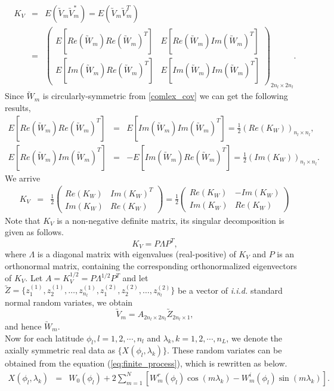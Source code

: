 	\begin{eqnarray*}
		K_V & = & E(\utilde{V}_m\utilde{V}_m^*) = E(\utilde{V}_m\utilde{V}_m^T) \\
		&=& \left(\begin{array}{ll}
		E[Re(\utilde{W}_m)Re(\utilde{W}_m)^T] &  E[Re(\utilde{W}_m)Im(\utilde{W}_m)^T] \\
		E[Im(\utilde{W}_m)Re(\utilde{W}_m)^T] &  E[Im(\utilde{W}_m)Im(\utilde{W}_m)^T]
		\end{array}
		\right)_{2n_{l}\times 2n_{l} }.
	\end{eqnarray*}			
Since $\utilde{W}_m$ is circularly-symmetric from \eqref{comlex_cov} we can get the following results,
\begin{eqnarray*}		
E[Re(\utilde{W}_m)Re(\utilde{W}_m)^T] &=& E[Im(\utilde{W}_m)Im(\utilde{W}_m)^T] = \frac{1}{2}(Re(K_W))_{n_{l}\times n_{l}}, \\
E[Re(\utilde{W}_m)Im(\utilde{W}_m)^T] &=& -E[Im(\utilde{W}_m)Re(\utilde{W}_m)^T] = \frac{1}{2}(Im(K_W))_{n_{l}\times n_{l}}.
\end{eqnarray*}
We arrive			
	\begin{eqnarray*}
		K_V&=& \frac{1}{2}\left( \begin{array}{ll}
		Re(K_W) & Im(K_W)^T \\
		Im(K_W) & Re(K_W)
		\end{array}
		\right) = \frac{1}{2}\left( \begin{array}{ll}
		Re(K_W) & -Im(K_W) \\
		Im(K_W) & Re(K_W)
		\end{array}
		\right)
	\end{eqnarray*}
Note that $K_V$ is a non-negative definite matrix, its singular decomposition is given as follows.
	\[ 
	K_V = P\Lambda P^T, 
	\]
where $\Lambda$ is a diagonal matrix with eigenvalues (real-positive) of $K_V$ and $P$ is an orthonormal matrix, containing the corresponding orthonormalized eigenvectors of $K_V$. Let $A = K_V^{1/2} = P\Lambda^{1/2} P^T$ and let $\utilde{Z} =\{z_1^{(1)}, z_2^{(1)}, \ldots, z_{n_l}^{(1)}, z_1^{(2)}, z_2^{(2)}, \ldots, z_{n_l}^{(2)}\}$ be a vector of {\em i.i.d.} standard normal random variates, we obtain 
	\[\utilde{V}_m=A_{2n_{l}\times 2n_{l}}\utilde{Z}_{2n_{l}\times 1},\]
and hence $\utilde{W}_m$.\\

Now for each latitude $\phi_l, l = 1, 2, \cdots, n_l$ and $\lambda_k, k = 1, 2, \cdots, n_L$, we denote the axially symmetric real data as $\{X(\phi_l, \lambda_k)\}$. These random variates can be obtained from the equation (\ref{eq:finite_process}), which is rewritten as below.
	\begin{eqnarray} \label{eq:finite_process_2}
		X(\phi_l,\lambda_k) &=& W_0(\phi_l) + 2 \sum_{m =1}^N \left[W_m^r(\phi_l)\cos(m\lambda_k) - W_m^i(\phi_l)\sin(m \lambda_k)\right].
	\end{eqnarray}
		
